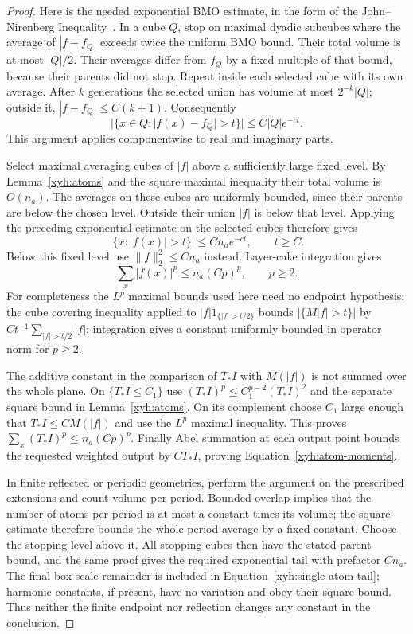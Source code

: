 \begin{proof}
Here is the needed exponential BMO estimate, in the form of the
John--Nirenberg Inequality~\citep{JohnNirenberg1961}. In a cube $Q$, stop
on maximal dyadic subcubes where the average of $|f-f_Q|$ exceeds
twice the uniform BMO bound. Their total volume is at most
$|Q|/2$. Their averages differ from $f_Q$ by a fixed multiple of
that bound, because their parents did not stop. Repeat inside each
selected cube with its own average. After $k$ generations the
selected union has volume at most $2^{-k}|Q|$; outside it,
$|f-f_Q|\le C(k+1)$. Consequently
\[
 |\{x\in Q:|f(x)-f_Q|>t\}|\le C|Q|e^{-ct}.
\]
This argument applies componentwise to real and imaginary parts.

Select maximal averaging cubes of $|f|$ above a sufficiently large
fixed level. By Lemma~\ref{xyh:atoms} and the square maximal
inequality their total volume is $O(n_a)$. The averages on these
cubes are uniformly bounded, since their parents are below the
chosen level. Outside their union $|f|$ is below that level.
Applying the preceding exponential estimate on the selected cubes
therefore gives
\[
 |\{x:|f(x)|>t\}|\le Cn_a e^{-ct},\qquad t\ge C.
\]
Below this fixed level use $\|f\|_2^2\le Cn_a$ instead.
Layer-cake integration gives
\[
 \sum_x|f(x)|^p\le n_a(Cp)^p,\qquad p\ge2.
\]
For completeness the $L^p$ maximal bounds used here need no
endpoint hypothesis: the cube covering inequality applied to
$|f|1_{\{|f|>t/2\}}$ bounds $|\{M|f|>t\}|$ by
$Ct^{-1}\sum_{|f|>t/2}|f|$; integration gives a constant uniformly
bounded in operator norm for $p\ge2$.

The additive constant in the comparison of $T_*I$ with $M(|f|)$
is not summed over the whole plane. On $\{T_*I\le C_1\}$ use
$(T_*I)^p\le C_1^{p-2}(T_*I)^2$ and the separate square bound in
Lemma~\ref{xyh:atoms}. On its complement choose $C_1$ large enough
that $T_*I\le C M(|f|)$ and use the $L^p$ maximal inequality.
This proves $\sum_x(T_*I)^p\le n_a(Cp)^p$.
Finally Abel summation at each output point bounds the requested
weighted output by $C T_*I$, proving
Equation~\eqref{xyh:atom-moments}.

In finite reflected or periodic geometries, perform the argument
on the prescribed extensions and count volume per period.
Bounded overlap implies that the number of atoms per period is
at most a constant times its volume; the square estimate therefore
bounds the whole-period average by a fixed constant. Choose the
stopping level above it. All stopping cubes then have the stated
parent bound, and the same proof gives the required exponential
tail with prefactor $Cn_a$. The final box-scale remainder is
included in Equation~\eqref{xyh:single-atom-tail}; harmonic
constants, if present, have no variation and obey their square
bound. Thus neither the finite endpoint nor reflection changes
any constant in the conclusion.
\end{proof}

